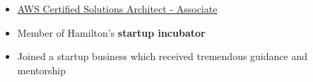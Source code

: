 \vspace{-2mm}

\begin{itemize}
    \item \href{https://tianyizhangawscert.s3.amazonaws.com/AWS+Certified+Solutions+Architect+-+Associate+certificate.pdf}{AWS Certified Solutions Architect - Associate}
\end{itemize}
\medskip

\vspace{-2mm}
\begin{itemize}
 \item Member of Hamilton’s \textbf{startup incubator}
 \item Joined a startup business which received tremendous guidance and mentorship

\end{itemize}



\medskip


